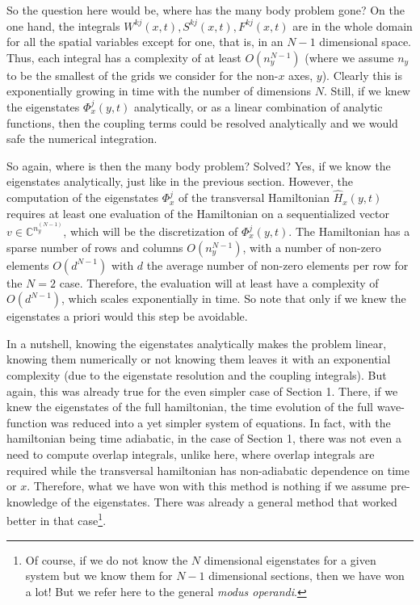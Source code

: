 \documentclass[11pt, a4paper]{article} %
\newcommand{\C}{\mathbb{C}}
\begin{document}
So the question here would be, where has the many body problem gone? On the one hand, the integrals $W^{kj}(x,t),S^{kj}(x,t),F^{kj}(x,t)$ are in the whole domain for all the spatial variables except for one, that is, in an $N-1$ dimensional space. Thus, each integral has a complexity of at least $O(n_y^{N-1})$ (where we assume $n_y$ to be the smallest of the grids we consider for the non-$x$ axes, $y$). Clearly this is exponentially growing in time with the number of dimensions $N$. Still, if we knew the eigenstates $\Phi^j_x(y,t)$ analytically, or as a linear combination of analytic functions, then the coupling terms could be resolved analytically and we would safe the numerical integration.

So again, where is then the many body problem? Solved? Yes, if we know the eigenstates analytically, just like in the previous section. However, the computation of the eigenstates $\Phi^j_x$ of the transversal Hamiltonian $\hat{H}_x(y,t)$ requires at least one evaluation of the Hamiltonian on a sequentialized vector $v\in\C^{n_y^{(N-1)}}$, which will be the discretization of $\Phi^j_x(y,t)$. The Hamiltonian has a sparse number of rows and columns $O(n_y^{N-1})$, with a number of non-zero elements $O(d^{N-1})$ with $d$ the average number of non-zero elements per row for the $N=2$ case. Therefore, the evaluation will at least have a complexity of $O(d^{N-1})$, which scales exponentially in time. So note that only if we knew the eigenstates a priori would this step be avoidable.

In a nutshell, knowing the eigenstates analytically makes the problem linear, knowing them numerically or not knowing them leaves it with an exponential complexity (due to the eigenstate resolution and the coupling integrals). But again, this was already true for the even simpler case of Section 1. There, if we knew the eigenstates of the full hamiltonian, the time evolution of the full wave-function was reduced into a yet simpler system of equations. In fact, with the hamiltonian being time adiabatic, in the case of Section 1, there was not even a need to compute overlap integrals, unlike here, where overlap integrals are required while the transversal hamiltonian has non-adiabatic dependence on time or $x$. Therefore, what we have won with this method is nothing if we assume pre-knowledge of the eigenstates. There was already a general method that worked better in that case\footnote{Of course, if we do not know the $N$ dimensional eigenstates for a given system but we know them for $N-1$ dimensional sections, then we have won a lot! But we refer here to the general {\em modus operandi}.}.
\end{document}
